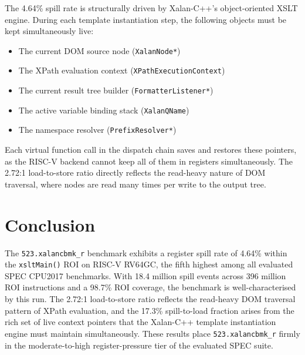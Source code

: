 \documentclass[conference]{IEEEtran}
\begin{document}
The 4.64\% spill rate is structurally driven by Xalan-C++'s
object-oriented XSLT engine. During each template instantiation step,
the following objects must be kept simultaneously live:
\begin{itemize}
    \item The current DOM source node (\texttt{XalanNode*})
    \item The XPath evaluation context (\texttt{XPathExecutionContext})
    \item The current result tree builder (\texttt{FormatterListener*})
    \item The active variable binding stack (\texttt{XalanQName})
    \item The namespace resolver (\texttt{PrefixResolver*})
\end{itemize}
Each virtual function call in the dispatch chain saves and restores
these pointers, as the RISC-V backend cannot keep all of them in
registers simultaneously. The 2.72:1 load-to-store ratio directly
reflects the read-heavy nature of DOM traversal, where nodes are
read many times per write to the output tree.

\section{Conclusion}

The \texttt{523.xalancbmk\_r} benchmark exhibits a register spill rate
of 4.64\% within the \texttt{xsltMain()} ROI on RISC-V RV64GC, the
fifth highest among all evaluated SPEC CPU2017 benchmarks. With 18.4
million spill events across 396 million ROI instructions and a 98.7\%
ROI coverage, the benchmark is well-characterised by this run. The
2.72:1 load-to-store ratio reflects the read-heavy DOM traversal
pattern of XPath evaluation, and the 17.3\% spill-to-load fraction
arises from the rich set of live context pointers that the Xalan-C++
template instantiation engine must maintain simultaneously. These
results place \texttt{523.xalancbmk\_r} firmly in the moderate-to-high
register-pressure tier of the evaluated SPEC suite.
\end{document}
